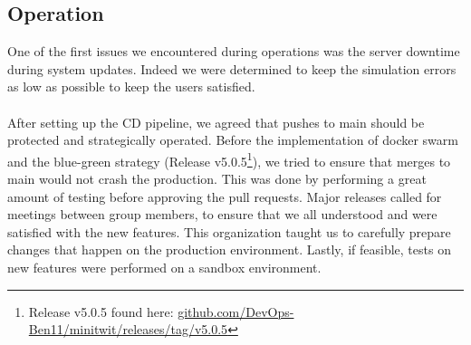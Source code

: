 \subsection{Operation}
One of the first issues we encountered during operations was the server downtime during system updates. Indeed we were determined to keep the simulation errors as low as possible to keep the users satisfied. 
\\
\\
After setting up the CD pipeline, we agreed that pushes to main should be protected and strategically operated. Before the implementation of docker swarm and the blue-green strategy (Release v5.0.5\footnote{Release v5.0.5 found here: 
\href{https://github.com/DevOps-Ben11/minitwit/releases/tag/v5.0.5}{github.com/DevOps-Ben11/minitwit/releases/tag/v5.0.5}}), we tried to ensure that merges to main would not crash the production. This was done by performing a great amount of testing before approving the pull requests. Major releases called for meetings between group members, to ensure that we all understood and were satisfied with the new features. This organization taught us to carefully prepare changes that happen on the production environment. Lastly, if feasible, tests on new features were performed on a sandbox environment. 



